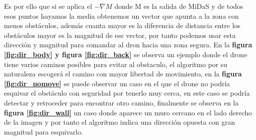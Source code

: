 Es por ello que si se aplica el $-\nabla{M}$ donde M es la salida de MiDaS y de todos esos puntos hayamos la media obtenemos un vector que apunta a la zona con menos obstáculos, además cuanta mayor es la diferencia de distancia entre los obstáculos mayor es la magnitud de ese vector, por tanto podemos usar esta dirección y magnitud para comandar al dron hacia una zona segura. En la \textbf{figura \ref{fig:dir_body} y figura \ref{fig:dir_back}} se observa un ejemplo donde el drone tiene varios caminos posibles para evitar al obstaculo, el algoritmo por su naturaleza escogerá el camino con mayor libertad de movimiento, en la \textbf{figura \ref{fig:dir_nomove}} se puede observar un caso en el que el drone no podría esquivar el obstáculo con seguridad por tenerlo muy cerca, en este caso se podría detectar y retroceder para encontrar otro camino, finalmente se observa en la \textbf{figura \ref{fig:dir_wall}} un caso donde aparece un muro cercano en el lado derecho de la imagen y por tanto el algoritmo indica una dirección opuesta con gran magnitud para esquivarlo.


